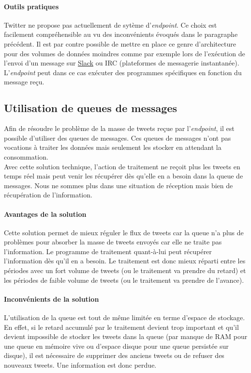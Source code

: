   \paragraph{Outils pratiques}
  \label{par:Outils pratiques}
  Twitter ne propose pas actuellement de sytème d'\textit{endpoint}. Ce choix est facilement compréhensible au vu des inconvénients évoqués dans le paragraphe précédent. Il est par contre possible de mettre en place ce genre d'architecture pour des volumes de données moindres comme par exemple lors de l'exécution de l'envoi d'un message sur \href{https://slack.com/}{Slack} ou IRC (plateformes de messagerie instantanée). L'\textit{endpoint} peut dans ce cas exécuter des programmes spécifiques en fonction du message reçu.

\subsection{Utilisation de queues de messages}
\label{sub:Utilisation de queues de messages}

  Afin de résoudre le problème de la masse de tweets reçue par l'\textit{endpoint}, il est possible d'utiliser des queues de messages. Ces queues de messages n'ont pas vocations à traiter les données mais seulement les stocker en attendant la consommation.\\

  Avec cette solution technique, l'action de traitement ne reçoit plus les tweets en temps réel mais peut venir les récupérer dès qu'elle en a besoin dans la queue de messages. Nous ne sommes plus dans une situation de réception mais bien de récupération de l'information.\\

  \paragraph{Avantages de la solution}
  \label{par:Avantages de la solution}
  Cette solution permet de mieux réguler le flux de tweets car la queue n'a plus de problèmes pour absorber la masse de tweets envoyés car elle ne traite pas l'information. Le programme de traitement quant-à-lui peut récupérer l'information dès qu'il en a besoin. Le traitement est donc mieux réparti entre les périodes avec un fort volume de tweets (ou le traitement va prendre du retard) et les périodes de faible volume de tweets (ou le traitement va prendre de l'avance).

  \paragraph{Inconvénients de la solution}
  \label{par:Inconvénients de la solution}
  L'utilisation de la queue est tout de même limitée en terme d'espace de stockage. En effet, si le retard accumulé par le traitement devient trop important et qu'il devient impossible de stocker les tweets dans la queue (par manque de RAM pour une queue en mémoire vive ou d'espace disque pour une queue persistée sur disque), il est nécessaire de supprimer des anciens tweets ou de refuser des nouveaux tweets. Une information est donc perdue.

